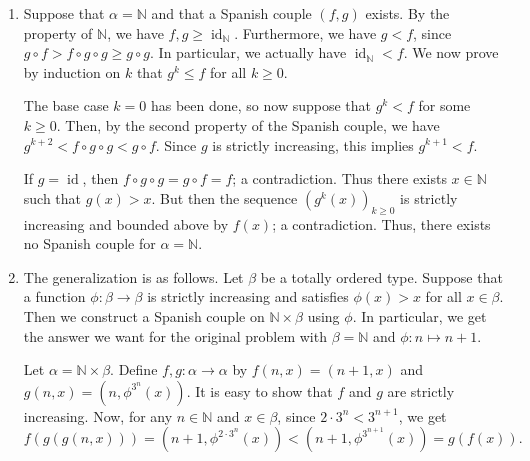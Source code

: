\documentclass{article}
\newcommand{\N}{\mathbb{N}}
\DeclareMathOperator{\id}{id}
\begin{document}
\begin{enumerate}[label=(\alph*)]

    \item
    Suppose that $\alpha = \N$ and that a Spanish couple $(f, g)$ exists.
    By the property of $\N$, we have $f, g \geq \id_{\N}$.
    Furthermore, we have $g < f$, since $g \circ f > f \circ g \circ g \geq g \circ g$.
    In particular, we actually have $\id_{\N} < f$.
    We now prove by induction on $k$ that $g^k \leq f$ for all $k \geq 0$.

    The base case $k = 0$ has been done, so now suppose that $g^k < f$ for some $k \geq 0$.
    Then, by the second property of the Spanish couple, we have $g^{k + 2} < f \circ g \circ g < g \circ f$.
    Since $g$ is strictly increasing, this implies $g^{k + 1} < f$.

    If $g = \id$, then $f \circ g \circ g = g \circ f = f$; a contradiction.
    Thus there exists $x \in \N$ such that $g(x) > x$.
    But then the sequence $(g^k(x))_{k \geq 0}$ is strictly increasing and bounded above by $f(x)$; a contradiction.
    Thus, there exists no Spanish couple for $\alpha = \N$.

    
    
    \item
    The generalization is as follows.
    Let $\beta$ be a totally ordered type.
    Suppose that a function $\phi : \beta \to \beta$ is strictly increasing and satisfies $\phi(x) > x$ for all $x \in \beta$.
    Then we construct a Spanish couple on $\N \times \beta$ using $\phi$.
    In particular, we get the answer we want for the original problem with $\beta = \N$ and $\phi : n \mapsto n + 1$.
    
    Let $\alpha = \N \times \beta$.
    Define $f, g : \alpha \to \alpha$ by $f(n, x) = (n + 1, x)$ and $g(n, x) = (n, \phi^{3^n}(x))$.
    It is easy to show that $f$ and $g$ are strictly increasing.
    Now, for any $n \in \N$ and $x \in \beta$, since $2 \cdot 3^n < 3^{n + 1}$, we get
    \[ f(g(g(n, x))) = (n + 1, \phi^{2 \cdot 3^n}(x)) < (n + 1, \phi^{3^{n + 1}}(x)) = g(f(x)). \]



\end{enumerate}
\end{document}
